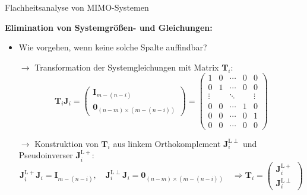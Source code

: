 \documentclass[
	ngerman,
	10pt,				%
	aspectratio=169, 	%
	xcolor=dvipsnames
]{beamer}
\begin{document}
\begin{frame}[t,fragile,label=Flachheit_4]{\large Flachheitsanalyse von MIMO-Systemen}
	
	\textbf{Elimination von Systemgrößen- und Gleichungen:}
	
	\begin{itemize}
		\item  Wie vorgehen, wenn keine solche Spalte auffindbar?
		\pause
		\item[$\rightarrow$] Transformation der Systemgleichungen mit Matrix $\mathbf{T}_i$: \\
		\begin{equation*}
			\mathbf{T}_i \mathbf{J}_i = 
			\begin{pmatrix}
				\mathbf{I}_{m-(n-i)} \\
				\hline
				\mathbf{0}_{(n-m) \times (m-(n-i))}
			\end{pmatrix}
			=
			\begin{pmatrix}
				1 & 0 & \cdots & 0 & 0 \\
				0 & 1 & \cdots & 0 & 0 \\
				\vdots & & \ddots &  & \vdots \\
				0 & 0 & \cdots & 1 & 0 \\
				0 & 0 & \cdots & 0 & 1 \\
				\hline
				0 & 0 & \cdots & 0 & 0
			\end{pmatrix}
		\end{equation*}
		\pause
		\item[$\rightarrow$] Konstruktion von $\mathbf{T}_i$ aus linkem Orthokomplement $\mathbf{J}_i^{\mathrm{L} \perp}$ und Pseudoinverser $\mathbf{J}_i^{\mathrm{L} +}$: \\
		\begin{equation*}
			\mathbf{J}_i^{\mathrm{L} +} \mathbf{J}_i = \mathbf{I}_{m-(n-i)}, \quad
			\mathbf{J}_i^{\mathrm{L} \perp} \mathbf{J}_i = \mathbf{0}_{(n-m) \times (m-(n-i))} \quad
			\Rightarrow \mathbf{T}_i = 
			\begin{pmatrix}
				\mathbf{J}_i^{\mathrm{L} +} \\
				\mathbf{J}_i^{\mathrm{L} \perp}
			\end{pmatrix}
		\end{equation*}
	\end{itemize}
	
\end{frame}

\end{document}
